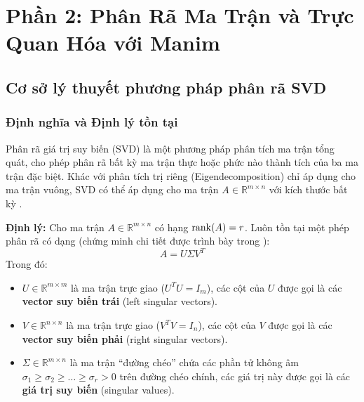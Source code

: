 \section{Phần 2: Phân Rã Ma Trận và Trực Quan Hóa với Manim}

\subsection{Cơ sở lý thuyết phương pháp phân rã SVD}

\subsubsection{Định nghĩa và Định lý tồn tại}
Phân rã giá trị suy biến (SVD) là một phương pháp phân tích ma trận tổng quát, cho phép phân rã bất kỳ ma trận thực hoặc phức nào thành tích của ba ma trận đặc biệt. Khác với phân tích trị riêng (Eigendecomposition) chỉ áp dụng cho ma trận vuông, SVD có thể áp dụng cho ma trận $A \in \mathbb{R}^{m \times n}$ với kích thước bất kỳ \cite{strang}.

\textbf{Định lý:} Cho ma trận $A \in \mathbb{R}^{m \times n}$ có hạng $\operatorname{rank}(A) = r$. Luôn tồn tại một phép phân rã có dạng (chứng minh chi tiết được trình bày trong \cite{strang, golub}):
\begin{equation}
    A = U \Sigma V^T
\end{equation}
Trong đó:
\begin{itemize}
    \item $U \in \mathbb{R}^{m \times m}$ là ma trận trực giao ($U^T U = I_m$), các cột của $U$ được gọi là các \textbf{vector suy biến trái} (left singular vectors).
    \item $V \in \mathbb{R}^{n \times n}$ là ma trận trực giao ($V^T V = I_n$), các cột của $V$ được gọi là các \textbf{vector suy biến phải} (right singular vectors).
    \item $\Sigma \in \mathbb{R}^{m \times n}$ là ma trận ``đường chéo'' chứa các phần tử không âm $\sigma_1 \geq \sigma_2 \geq \dots \geq \sigma_r > 0$ trên đường chéo chính, các giá trị này được gọi là các \textbf{giá trị suy biến} (singular values).
\end{itemize}

